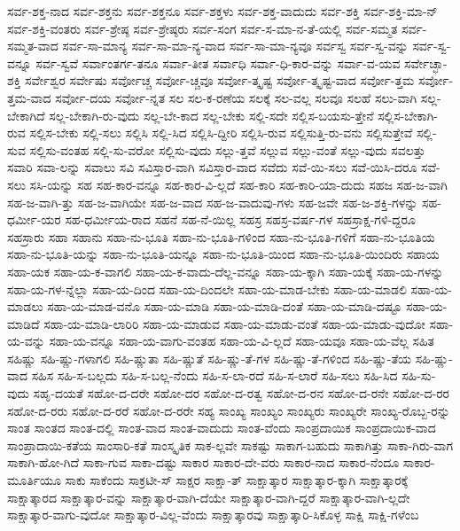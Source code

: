 {ಸರ್ವ-ಶಕ್ತ-ನಾದ
ಸರ್ವ-ಶಕ್ತನು
ಸರ್ವ-ಶಕ್ತನೂ
ಸರ್ವ-ಶಕ್ತಳು
ಸರ್ವ-ಶಕ್ತ-ವಾದುದು
ಸರ್ವ-ಶಕ್ತಿ
ಸರ್ವ-ಶಕ್ತಿ-ಮಾ-ನ್
ಸರ್ವ-ಶಕ್ತಿ-ವಂತರು
ಸರ್ವ-ಶ್ರೇಷ್ಠ
ಸರ್ವ-ಶ್ರೇಷ್ಠರು
ಸರ್ವ-ಸಂಗ
ಸರ್ವ-ಸ-ಮಾ-ನ-ತೆ-ಯಲ್ಲಿ
ಸರ್ವ-ಸಮ್ಮತ
ಸರ್ವ-ಸಮ್ಮತ-ವಾದ
ಸರ್ವ-ಸಾ-ಮಾನ್ಯ
ಸರ್ವ-ಸಾ-ಮಾ-ನ್ಯ-ವಾದ
ಸರ್ವ-ಸಾ-ಮಾ-ನ್ಯವೂ
ಸರ್ವಸ್ವ
ಸರ್ವ-ಸ್ವ-ವನ್ನು
ಸರ್ವ-ಸ್ವ-ವನ್ನೂ
ಸರ್ವ-ಸ್ವವೆ
ಸರ್ವಾಂತರ್ಗ-ತನೂ
ಸರ್ವಾ-ತೀತ
ಸರ್ವಾಧಿ
ಸರ್ವಾ-ಧಿ-ಕಾರ-ವನ್ನು
ಸರ್ವಾ-ವ-ಯವ
ಸರ್ವೇಚ್ಛಾ-ಶಕ್ತಿ
ಸರ್ವೇಶ್ವರ
ಸರ್ವೇಷು
ಸರ್ವೋಚ್ಚ
ಸರ್ವೋ-ಚ್ಚವೂ
ಸರ್ವೋ-ತ್ಕೃಷ್ಟ
ಸರ್ವೋ-ತ್ಕೃಷ್ಟ-ವಾದ
ಸರ್ವೋ-ತ್ತಮ
ಸರ್ವೋ-ತ್ತಮ-ವಾದ
ಸರ್ವೋ-ದಯ
ಸರ್ವೋ-ನ್ನತ
ಸಲ
ಸಲ-ಕ-ರಣೆಯ
ಸಲಕ್ಕೆ
ಸಲ-ವಲ್ಲ
ಸಲವೂ
ಸಲಹೆ
ಸಲು-ವಾಗಿ
ಸಲ್ಲ-ಬೇಕಾಗಿದೆ
ಸಲ್ಲ-ಬೇಕಾಗಿ-ರು-ವುದು
ಸಲ್ಲ-ಬೇ-ಕಾದ
ಸಲ್ಲ-ಬೇಕು
ಸಲ್ಲಿ-ಸದೇ
ಸಲ್ಲಿಸ-ಬಯಸು-ತ್ತೇನೆ
ಸಲ್ಲಿಸ-ಬೇಕಾಗಿ-ರುವ
ಸಲ್ಲಿಸ-ಬೇಕು
ಸಲ್ಲಿ-ಸಲು
ಸಲ್ಲಿಸಿ
ಸಲ್ಲಿ-ಸಿದ
ಸಲ್ಲಿಸಿ-ದ್ದೀರಿ
ಸಲ್ಲಿಸಿ-ರುವ
ಸಲ್ಲಿಸುತ್ತಿ-ರು-ವನು
ಸಲ್ಲಿಸುತ್ತೇವೆ
ಸಲ್ಲಿ-ಸುವ
ಸಲ್ಲಿಸು-ವಂತಹ
ಸಲ್ಲಿ-ಸು-ವರೋ
ಸಲ್ಲಿಸು-ವುದು
ಸಲ್ಲು-ತ್ತವೆ
ಸಲ್ಲುವ
ಸಲ್ಲು-ವಂತೆ
ಸಲ್ಲು-ವುದು
ಸವಲತ್ತು
ಸವಾರಿ
ಸವಾ-ಲನ್ನು
ಸವಾಲು
ಸವಿ
ಸವಿಸ್ತಾರ-ವಾಗಿ
ಸವಿಸ್ತಾರ-ವಾದ
ಸವೆದು
ಸವೆ-ಯಿ-ಸಲು
ಸವೆ-ಯಿಸಿ-ದರೂ
ಸವೆ-ಸಲು
ಸಸಿ-ಯನ್ನು
ಸಹ
ಸಹ-ಕಾರ-ವನ್ನೂ
ಸಹ-ಕಾರ-ವಿ-ಲ್ಲದೆ
ಸಹ-ಕಾರಿ
ಸಹ-ಕಾರಿ-ಯಾ-ದುದು
ಸಹಜ
ಸಹ-ಜ-ವಾಗಿ
ಸಹ-ಜ-ವಾಗಿ-ತ್ತು
ಸಹ-ಜ-ವಾಗಿಯೇ
ಸಹ-ಜ-ವಾದ
ಸಹ-ಜ-ವಾದುವು-ಗಳು
ಸಹ-ಜವೇ
ಸಹ-ಜ-ಶಕ್ತಿ-ಗಳನ್ನು
ಸಹ-ಧರ್ಮೀ-ಯರ
ಸಹ-ಧರ್ಮೀಯ-ರಾದ
ಸಹನೆ
ಸಹ-ನೆ-ಯಿಲ್ಲ
ಸಹಸ್ರ
ಸಹಸ್ರ-ವರ್ಷ-ಗಳ
ಸಹಸ್ರಾಕ್ಷ-ಗಳಿ-ದ್ದರೂ
ಸಹಸ್ರಾರು
ಸಹಾ
ಸಹಾನು
ಸಹಾ-ನು-ಭೂತಿ
ಸಹಾ-ನು-ಭೂತಿ-ಗಳಿಂದ
ಸಹಾ-ನು-ಭೂತಿ-ಗಳಿಗೆ
ಸಹಾ-ನು-ಭೂತಿಯ
ಸಹಾ-ನು-ಭೂತಿ-ಯನ್ನು
ಸಹಾ-ನು-ಭೂತಿ-ಯನ್ನೂ
ಸಹಾ-ನು-ಭೂತಿ-ಯಿಂದ
ಸಹಾ-ನು-ಭೂತಿ-ಯಿಂದಿರು
ಸಹಾಯ
ಸಹಾ-ಯಕ
ಸಹಾ-ಯ-ಕ-ವಾಗಲಿ
ಸಹಾ-ಯ-ಕ-ವಾದು-ದೆಲ್ಲ-ವನ್ನೂ
ಸಹಾ-ಯ-ಕ್ಕಾಗಿ
ಸಹಾ-ಯಕ್ಕೆ
ಸಹಾ-ಯ-ಗಳನ್ನು
ಸಹಾ-ಯ-ಗಳ-ನ್ನೆಲ್ಲಾ
ಸಹಾ-ಯ-ದಿಂದ
ಸಹಾ-ಯ-ದಿಂದಲೇ
ಸಹಾ-ಯ-ಮಾಡ-ಬೇಕು
ಸಹಾ-ಯ-ಮಾಡಲಿ
ಸಹಾ-ಯ-ಮಾಡಲು
ಸಹಾ-ಯ-ಮಾಡ-ವನೊ
ಸಹಾ-ಯ-ಮಾಡಿ
ಸಹಾ-ಯ-ಮಾಡಿ-ದಂತೆ
ಸಹಾ-ಯ-ಮಾಡಿ-ದಷ್ಟೂ
ಸಹಾ-ಯ-ಮಾಡಿದೆ
ಸಹಾ-ಯ-ಮಾಡಿ-ಲಾರಿರಿ
ಸಹಾ-ಯ-ಮಾಡುವ
ಸಹಾ-ಯ-ಮಾಡು-ವಂತೆ
ಸಹಾ-ಯ-ಮಾಡು-ವುದೋ
ಸಹಾ-ಯ-ವನ್ನು
ಸಹಾ-ಯ-ವನ್ನೂ
ಸಹಾ-ಯ-ವಾಗು-ವಂತಹ
ಸಹಾ-ಯ-ವಿ-ಲ್ಲದೆ
ಸಹಾ-ಯವೂ
ಸಹಾ-ಯ-ವೆಲ್ಲ
ಸಹಿತ
ಸಹಿಷ್ಣು
ಸಹಿ-ಷ್ಣು-ಗಳಾಗಲಿ
ಸಹಿ-ಷ್ಣುತಾ
ಸಹಿ-ಷ್ಣುತೆ
ಸಹಿ-ಷ್ಣು-ತೆ-ಗಳ
ಸಹಿ-ಷ್ಣು-ತೆ-ಗಳಿಂದ
ಸಹಿ-ಷ್ಣು-ತೆಯ
ಸಹಿ-ಷ್ಣು-ವಾದ
ಸಹಿಸ
ಸಹಿ-ಸ-ಬಲ್ಲದು
ಸಹಿ-ಸ-ಬಲ್ಲ-ನೆಂದು
ಸಹಿ-ಸ-ಲಾ-ರದೆ
ಸಹಿ-ಸ-ಲಾರೆ
ಸಹಿ-ಸಲು
ಸಹಿ-ಸಿದ
ಸಹಿ-ಸು-ವುದು
ಸಹೃ-ದಯತೆ
ಸಹೋ-ದ-ದರೇ
ಸಹೋ-ದರ
ಸಹೋ-ದ-ರತ್ವ
ಸಹೋ-ದ-ರನ
ಸಹೋ-ದ-ರನೇ
ಸಹೋ-ದ-ರರ
ಸಹೋ-ದ-ರರು
ಸಹೋ-ದ-ರರೆ
ಸಹೋ-ದ-ರರೇ
ಸಹ್ಯ
ಸಾಂಖ್ಯ
ಸಾಂಖ್ಯಂ
ಸಾಂಖ್ಯರು
ಸಾಂಖ್ಯರೇ
ಸಾಂಖ್ಯ-ರೊಬ್ಬ-ರನ್ನು
ಸಾಂತ
ಸಾಂತದ
ಸಾಂತ-ದಲ್ಲಿ
ಸಾಂತ-ವಾದ
ಸಾಂತ-ವಾದುದು
ಸಾಂತ-ವೆಂದು
ಸಾಂಪ್ರದಾಯಿಕ
ಸಾಂಪ್ರದಾಯಿಕ-ವಾದ
ಸಾಂಪ್ರಾದಾಯಿ-ಕತೆಯ
ಸಾಂಸಾರಿ-ಕತೆ
ಸಾಂಸ್ಕೃತಿಕ
ಸಾಕ-ಲ್ಲವೇ
ಸಾಕಷ್ಟು
ಸಾಕಾಗ-ಬಹುದು
ಸಾಕಾಗಿತ್ತು
ಸಾಕಾ-ಗಿರು-ವಾಗ
ಸಾಕಾಗಿ-ಹೋ-ಗಿದೆ
ಸಾಕಾ-ಗುವ
ಸಾಕಾ-ದಷ್ಟು
ಸಾಕಾರ
ಸಾಕಾರ-ದೇ-ವರು
ಸಾಕಾರ-ನಾದ
ಸಾಕಾರ-ನೆಂದೂ
ಸಾಕಾರ-ಮೂರ್ತಿಯೂ
ಸಾಕು
ಸಾಕೆಂದು
ಸಾಕ್ರಟೀ-ಸ್
ಸಾಕ್ಷರ
ಸಾಕ್ಷಾ-ತ್
ಸಾಕ್ಷಾತ್ಕಾರ
ಸಾಕ್ಷಾತ್ಕಾರ-ಕ್ಕಾಗಿ
ಸಾಕ್ಷಾತ್ಕಾರಕ್ಕೆ
ಸಾಕ್ಷಾತ್ಕಾರದ
ಸಾಕ್ಷಾತ್ಕಾರ-ವನ್ನು
ಸಾಕ್ಷಾತ್ಕಾರ-ವಾಗಿ-ದೆಯೇ
ಸಾಕ್ಷಾತ್ಕಾರ-ವಾಗಿ-ದ್ದರೆ
ಸಾಕ್ಷಾತ್ಕಾರ-ವಾಗಿ-ಲ್ಲದೇ
ಸಾಕ್ಷಾತ್ಕಾರ-ವಾಗು-ವುದೋ
ಸಾಕ್ಷಾತ್ಕಾರ-ವಿಲ್ಲ-ವೆಂದು
ಸಾಕ್ಷಾತ್ಕಾರವು
ಸಾಕ್ಷಾತ್ಕಾರಿ-ಸಿಕೊಳ್ಳ
ಸಾಕ್ಷಿ
ಸಾಕ್ಷಿ-ಗಳೆಂಬ
}
